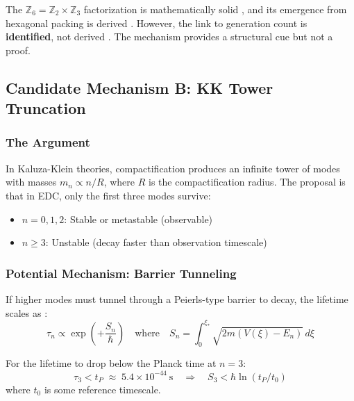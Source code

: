 \begin{tcolorbox}[colback=red!5, colframe=red!50!black,
    title=\textbf{Mechanism A Verdict: YELLOW/RED}]
The $\mathbb{Z}_6 = \mathbb{Z}_2 \times \mathbb{Z}_3$ factorization is mathematically
solid \tagM{}, and its emergence from hexagonal packing is derived \tagDc{}.
However, the link to generation count is \textbf{identified}, not derived \tagI{}.
The mechanism provides a structural cue but not a proof.
\end{tcolorbox}

\subsection{Candidate Mechanism B: KK Tower Truncation}
\label{sec:ch5_mechanism_b}

\subsubsection{The Argument}

In Kaluza-Klein theories, compactification produces an infinite tower of modes
with masses $m_n \propto n/R$, where $R$ is the compactification radius.
The proposal is that in EDC, only the first three modes survive:

\begin{itemize}[nosep]
    \item $n = 0, 1, 2$: Stable or metastable (observable)
    \item $n \geq 3$: Unstable (decay faster than observation timescale)
\end{itemize}

\subsubsection{Potential Mechanism: Barrier Tunneling}

If higher modes must tunnel through a Peierls-type barrier to decay, the
lifetime scales as \tagP{}:
\begin{equation}
    \tau_n \propto \exp\left(+\frac{S_n}{\hbar}\right)
    \quad\text{where}\quad
    S_n = \int_0^{\xi_*} \sqrt{2m(V(\xi) - E_n)} \, d\xi
    \label{eq:ch5_lifetime}
\end{equation}

For the lifetime to drop below the Planck time at $n = 3$:
\begin{equation}
    \tau_3 < t_P \;\approx\; 5.4 \times 10^{-44}~\text{s}
    \quad\Longrightarrow\quad
    S_3 < \hbar \ln(t_P / t_0)
    \label{eq:ch5_truncation_cond}
\end{equation}
where $t_0$ is some reference timescale.

